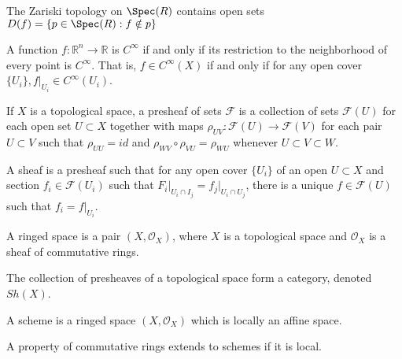 \documentclass[crop=false,class=article,oneside]{standalone}
\begin{document}
    \begin{theorem}
    The Zariski topology on $\Spec(R)$ contains open sets $D(f)=\{p\in\Spec(R):f\notin p\}$
    \end{theorem}
    A function $f:\mathbb{R}^n \rightarrow \mathbb{R}$ is $C^{\infty}$ if and only if its restriction to the neighborhood of every point is $C^{\infty}$. That is, $f\in C^{\infty}(X)$ if and only if for any open cover $\{U_i\},f\big|_{U_i}\in C^{\infty}(U_i)$.
    \begin{definition}
    If $X$ is a topological space, a presheaf of sets $\mathcal{F}$ is a collection of sets $\mathcal{F}(U)$ for each open set $U\subset X$ together with maps $\rho_{UV}:\mathcal{F}(U)\rightarrow \mathcal{F}(V)$ for each pair $U\subset V$ such that $\rho_{UU} = id$ and $\rho_{WV}\circ \rho_{VU} = \rho_{WU}$ whenever $U\subset V \subset W$.
    \end{definition}
    \begin{definition}
    A sheaf is a presheaf such that for any open cover $\{U_i\}$ of an open $U\subset X$ and section $f_i \in \mathcal{F}(U_i)$ such that $F_i\big|_{U_i\cap I_j} = f_j\big|_{U_i\cap U_j}$, there is a unique $f\in \mathcal{F}(U)$ such that $f_i = f\big|_{U_i}$.
    \end{definition}
    \begin{definition}
    A ringed space is a pair $(X,\mathcal{O}_X)$, where $X$ is a topological space and $\mathcal{O}_X$ is a sheaf of commutative rings.
    \end{definition}
    The collection of presheaves of a topological space form a category, denoted $Sh(X)$. 
    \begin{definition}
    A scheme is a ringed space $(X,\mathcal{O}_X)$ which is locally an affine space.
    \end{definition}
    \begin{theorem}
    A property of commutative rings extends to schemes if it is local.
    \end{theorem}
\end{document}
